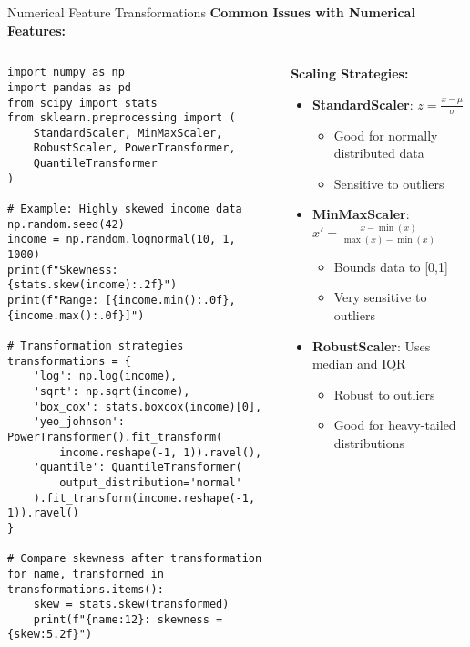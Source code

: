 \documentclass[aspectratio=169,11pt]{beamer}
\begin{document}
\begin{frame}[fragile]{Numerical Feature Transformations}
\textbf{Common Issues with Numerical Features:}

\begin{columns}
\begin{column}{0.5\textwidth}
\begin{lstlisting}
import numpy as np
import pandas as pd
from scipy import stats
from sklearn.preprocessing import (
    StandardScaler, MinMaxScaler, 
    RobustScaler, PowerTransformer,
    QuantileTransformer
)

# Example: Highly skewed income data
np.random.seed(42)
income = np.random.lognormal(10, 1, 1000)
print(f"Skewness: {stats.skew(income):.2f}")
print(f"Range: [{income.min():.0f}, {income.max():.0f}]")

# Transformation strategies
transformations = {
    'log': np.log(income),
    'sqrt': np.sqrt(income),
    'box_cox': stats.boxcox(income)[0],
    'yeo_johnson': PowerTransformer().fit_transform(
        income.reshape(-1, 1)).ravel(),
    'quantile': QuantileTransformer(
        output_distribution='normal'
    ).fit_transform(income.reshape(-1, 1)).ravel()
}

# Compare skewness after transformation
for name, transformed in transformations.items():
    skew = stats.skew(transformed)
    print(f"{name:12}: skewness = {skew:5.2f}")
\end{lstlisting}
\end{column}
\begin{column}{0.5\textwidth}
\textbf{Scaling Strategies:}

\begin{itemize}
\item \textbf{StandardScaler}: $z = \frac{x - \mu}{\sigma}$
  \begin{itemize}
  \item Good for normally distributed data
  \item Sensitive to outliers
  \end{itemize}

\item \textbf{MinMaxScaler}: $x' = \frac{x - \min(x)}{\max(x) - \min(x)}$
  \begin{itemize}
  \item Bounds data to [0,1]
  \item Very sensitive to outliers
  \end{itemize}

\item \textbf{RobustScaler}: Uses median and IQR
  \begin{itemize}
  \item Robust to outliers
  \item Good for heavy-tailed distributions
  \end{itemize}
\end{itemize}


\end{column}
\end{columns}
\end{frame}
\end{document}
